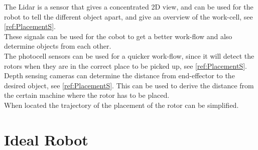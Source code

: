 The Lidar is a sensor that gives a concentrated 2D view, and can be used for the robot to tell the different object apart, and give an overview of the work-cell, see \ref{ref:PlacementS}.\\
These signals can be used for the cobot to get a better work-flow and also determine objects from each other.\\

The photocell sensors can be used for a quicker work-flow, since it will detect the rotors when they are in the correct place to be picked up, see \ref{ref:PlacementS}.\\

Depth sensing cameras can determine the distance from end-effector to the desired object, see \ref{ref:PlacementS}. This can be used to derive the distance from the certain machine where the rotor has to be placed.\\
When located the trajectory of the placement of the rotor can be simplified.

\chapter{Ideal Robot}\label{IdealRobot}